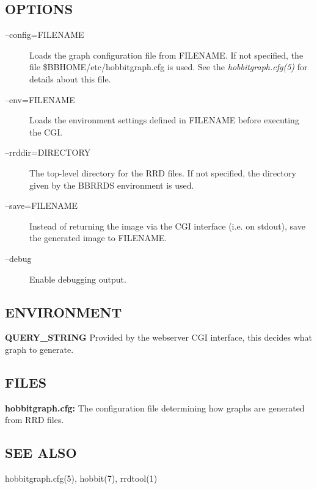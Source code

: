 \subsection{OPTIONS}
\begin{description}
\item[--config=FILENAME] Loads the graph configuration file from FILENAME. If not specified, the file \$BBHOME/etc/hobbitgraph.cfg is used. See the \emph{hobbitgraph.cfg(5)}
 for details about this file. 

 

\item[--env=FILENAME] Loads the environment settings defined in FILENAME before executing the CGI. 

 

\item[--rrddir=DIRECTORY] The top-level directory for the RRD files. If not specified, the directory given by the BBRRDS environment is used. 

 

\item[--save=FILENAME] Instead of returning the image via the CGI interface (i.e. on stdout), save the generated image to FILENAME. 

 

\item[--debug] Enable debugging output. 

 


\end{description}
\subsection{ENVIRONMENT}


 \textbf{QUERY\_STRING}
 Provided by the webserver CGI interface, this decides what graph to generate. 


 
\subsection{FILES}


 \textbf{hobbitgraph.cfg:}
 The configuration file determining how graphs are generated from RRD files. 


 
\subsection{SEE ALSO}
hobbitgraph.cfg(5), hobbit(7), rrdtool(1) 


